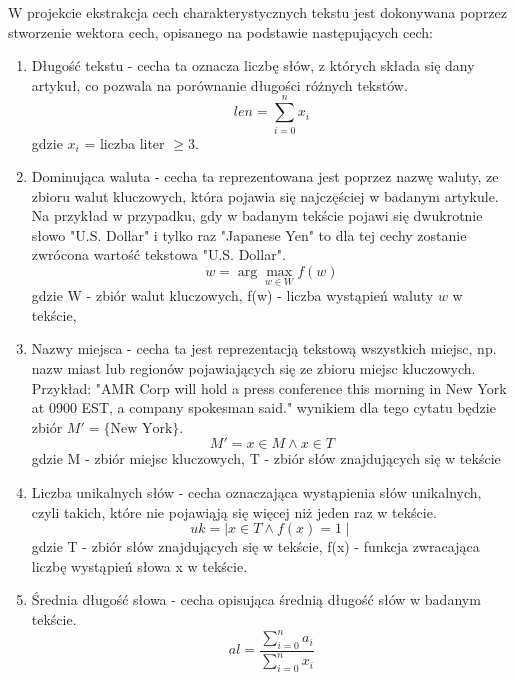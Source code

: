 \documentclass{article}
\begin{document}
W projekcie ekstrakcja cech charakterystycznych tekstu jest dokonywana poprzez stworzenie wektora cech, opisanego na podstawie następujących cech:
\begin{enumerate}
    \item Długość tekstu - cecha ta oznacza liczbę słów, z których składa się dany artykuł, co pozwala na porównanie długości różnych tekstów.
        \begin{equation}
            len = \sum_{i=0}^{n} x_i
        \end{equation}
        gdzie \( x_i \) = liczba liter \( \geq 3 \).
    \item Dominująca waluta - cecha ta reprezentowana jest poprzez nazwę waluty, ze zbioru walut kluczowych, która pojawia się najczęściej w badanym artykule. Na przykład w przypadku, gdy w badanym tekście pojawi się dwukrotnie słowo "U.S. Dollar" i tylko raz "Japanese Yen" to dla tej cechy zostanie zwrócona wartość tekstowa "U.S. Dollar".
        \begin{equation}
            w = \arg\max_{w \in W} f(w)
        \end{equation}
        gdzie W - zbiór walut kluczowych, f(w) - liczba wystąpień waluty \( w \) w tekście,
    \item Nazwy miejsca - cecha ta jest reprezentacją tekstową wszystkich miejsc, np. nazw miast lub regionów pojawiających się ze zbioru miejsc kluczowych. Przykład: "AMR Corp will hold a press conference this morning in New York at 0900 EST, a company spokesman said." wynikiem dla tego cytatu będzie zbiór \( M' = \{ \text{New York} \} \). 
        \begin{equation}
            M' =  x \in M  \land x \in T
        \end{equation}
        gdzie M - zbiór miejsc kluczowych, T - zbiór słów znajdujących się w tekście
    \item Liczba unikalnych słów - cecha oznaczająca wystąpienia słów unikalnych, czyli takich, które nie pojawiąją się więcej niż jeden raz w tekście.
        \begin{equation}
            uk = \mid x \in T \land f(x) = 1 \mid
        \end{equation}
        gdzie T - zbiór słów znajdujących się w tekście, f(x) - funkcja zwracająca liczbę wystąpień słowa x w tekście.
    \item Średnia długość słowa - cecha opisująca średnią długość słów w badanym tekście.
     \begin{equation}
            al = \frac{\sum_{i=0}^{n} a_i}{\sum_{i=0}^{n} x_i}

\end{equation}
\end{enumerate}
\end{document}
